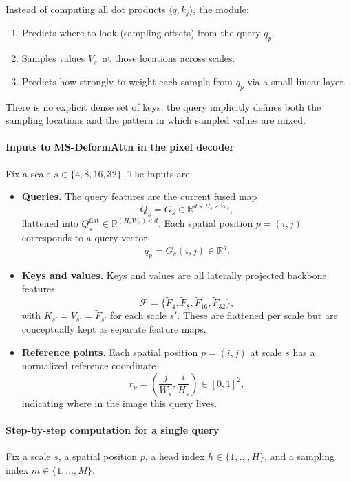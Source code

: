 \begin{enrichment}
\begin{enrichment}
		Instead of computing all dot products $\langle q,k_j\rangle$, the module:
		\begin{enumerate}
			\item Predicts where to look (sampling offsets) from the query $q_p$.
			\item Samples values $V_{s'}$ at those locations across scales.
			\item Predicts how strongly to weight each sample from $q_p$ via a small linear layer.
		\end{enumerate}
		
		There is no explicit dense set of keys; the query implicitly defines both the sampling locations and the pattern in which sampled values are mixed.
		
		\paragraph{Inputs to MS-DeformAttn in the pixel decoder}
		Fix a scale $s \in \{4,8,16,32\}$. The inputs are:
		\begin{itemize}
			\item \textbf{Queries.} The query features are the current fused map
			\[
			Q_s = G_s \in \mathbb{R}^{d \times H_s \times W_s},
			\]
			flattened into $Q_s^{\text{flat}} \in \mathbb{R}^{(H_s W_s) \times d}$. Each spatial position $p=(i,j)$ corresponds to a query vector
			\[
			q_p = G_s(i,j) \in \mathbb{R}^d.
			\]
			\item \textbf{Keys and values.} Keys and values are all laterally projected backbone features
			\[
			\mathcal{F} = \{\tilde F_{4}, \tilde F_{8}, \tilde F_{16}, \tilde F_{32}\},
			\]
			with $K_{s'} = V_{s'} = \tilde F_{s'}$ for each scale $s'$. These are flattened per scale but are conceptually kept as separate feature maps.
			\item \textbf{Reference points.} Each spatial position $p=(i,j)$ at scale $s$ has a normalized reference coordinate
			\[
			r_p = \left(\frac{j}{W_s}, \frac{i}{H_s}\right) \in [0,1]^2,
			\]
			indicating where in the image this query lives.
		\end{itemize}
		
		\paragraph{Step-by-step computation for a single query}
		Fix a scale $s$, a spatial position $p$, a head index $h \in \{1,\dots,H\}$, and a sampling index $m \in \{1,\dots,M\}$.
		

\end{enrichment}
\end{enrichment}
